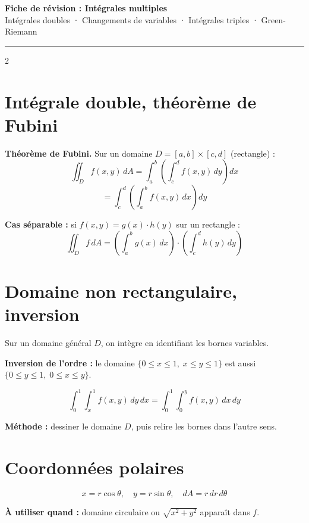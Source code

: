 \documentclass[10pt,a4paper]{article}
\begin{document}
\begin{center}
  {\Large\bfseries\color{bleu} Fiche de révision : Intégrales multiples}\\[3pt]
  {\small Intégrales doubles · Changements de variables · Intégrales triples · Green-Riemann}
\end{center}
\noindent\rule{\linewidth}{0.8pt}

\begin{multicols}{2}

\section{Intégrale double, théorème de Fubini}

\begin{theobox}
\textbf{Théorème de Fubini.} Sur un domaine $D=[a,b]\times[c,d]$ (rectangle) :
$$\iint_D f(x,y)\,dA = \int_a^b\!\left(\int_c^d f(x,y)\,dy\right)dx$$
$$= \int_c^d\!\left(\int_a^b f(x,y)\,dx\right)dy$$

\textbf{Cas séparable :} si $f(x,y)=g(x)\cdot h(y)$ sur un rectangle :
$$\iint_D f\,dA = \left(\int_a^b g(x)\,dx\right)\cdot\left(\int_c^d h(y)\,dy\right)$$
\end{theobox}

\section{Domaine non rectangulaire, inversion}

\begin{grisbox}
Sur un domaine général $D$, on intègre en identifiant les bornes variables.

\textbf{Inversion de l'ordre :} le domaine $\{0\le x\le 1,\; x\le y\le 1\}$ est aussi $\{0\le y\le 1,\; 0\le x\le y\}$.

$$\int_0^1\!\int_x^1 f(x,y)\,dy\,dx = \int_0^1\!\int_0^y f(x,y)\,dx\,dy$$

\textbf{Méthode :} dessiner le domaine $D$, puis relire les bornes dans l'autre sens.
\end{grisbox}

\section{Coordonnées polaires}

\begin{grisbox}
$$x = r\cos\theta,\quad y = r\sin\theta,\quad dA = r\,dr\,d\theta$$

\textbf{À utiliser quand :} domaine circulaire ou $\sqrt{x^2+y^2}$ apparaît dans $f$.


\end{grisbox}
\end{multicols}
\end{document}
